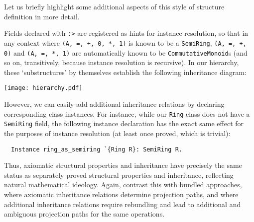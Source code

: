 \documentclass[a4paper,10pt,runningheads]{llncs}
\begin{document}
Let us briefly highlight some additional aspects of this style of structure definition in more detail.

Fields declared with \lstinline|:>| are registered as hints for instance resolution, so that in any context where \lstinline|(A, =, +, 0, *, 1)| is known to be a \lstinline|SemiRing|, \lstinline|(A, =, +, 0)| and \lstinline|(A, =, *, 1)| are automatically known to be \lstinline|CommutativeMonoid|s (and so on, transitively, because instance resolution is recursive). In our hierarchy, these `substructures' by themselves establish the following inheritance diagram:

\vspace{5mm}
\begin{center}
\texttt{[image: hierarchy.pdf]}
\end{center}
\vspace{5mm}


However, we can easily add additional inheritance relations by declaring corresponding class instances. For instance, while our \lstinline|Ring| class does not have a \lstinline|SemiRing| field, the following instance declaration has the exact same effect for the purposes of instance resolution (at least once proved, which is trivial):
\begin{lstlisting}
  Instance ring_as_semiring `{Ring R}: SemiRing R.
\end{lstlisting}

Thus, axiomatic structural properties and inheritance have precisely the same status as separately proved structural properties and inheritance, reflecting natural mathematical ideology. Again, contrast this with bundled approaches, where axiomatic inheritance relations determine projection paths, and where additional inheritance relations require rebundling and lead to additional and ambiguous projection paths for the same operations.

\end{document}
